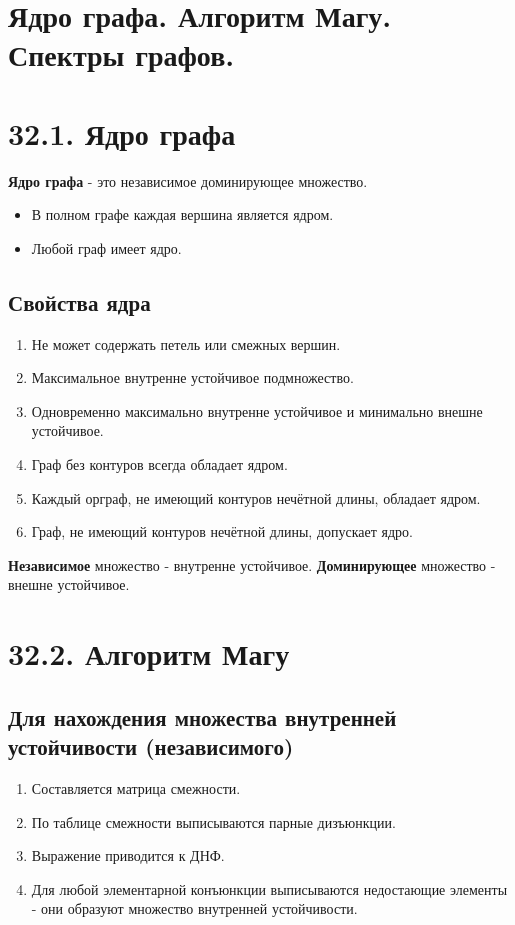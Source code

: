 {
	\section{Ядро графа. Алгоритм Магу. Спектры графов.}


\section*{32.1.
Ядро графа}

\textbf{Ядро графа} - это независимое доминирующее множество.

\begin{itemize}
  \item В полном графе каждая вершина является ядром.
  \item Любой граф имеет ядро.
\end{itemize}

\subsection*{Свойства ядра}

\begin{enumerate}
  \item Не может содержать петель или смежных вершин.
  \item Максимальное внутренне устойчивое подмножество.
  \item Одновременно максимально внутренне устойчивое и минимально внешне устойчивое.
  \item Граф без контуров всегда обладает ядром.
  \item Каждый орграф, не имеющий контуров нечётной длины, обладает ядром.
  \item Граф, не имеющий контуров нечётной длины, допускает ядро.
\end{enumerate}

\textbf{Независимое} множество - внутренне устойчивое.  
\textbf{Доминирующее} множество - внешне устойчивое.

\section*{32.2. 
Алгоритм Магу}

\subsection*{Для нахождения множества внутренней устойчивости (независимого)}

\begin{enumerate}
  \item Составляется матрица смежности.
  \item По таблице смежности выписываются парные дизъюнкции.
  \item Выражение приводится к ДНФ.
  \item Для любой элементарной конъюнкции выписываются недостающие элементы - они образуют множество внутренней устойчивости.
\end{enumerate}

}
